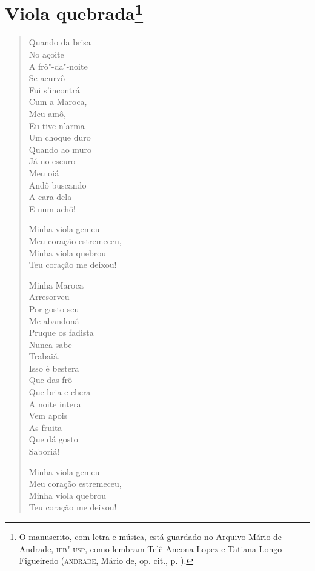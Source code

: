 \chapter{Viola quebrada\footnote[*]{O manuscrito, com letra e música, está
  guardado no Arquivo Mário de Andrade, \textsc{ieb"-usp}, como lembram Telê
  Ancona Lopez e Tatiana Longo Figueiredo (\textsc{andrade}, Mário de, op. cit.,
  p. ).}}

\begin{verse}
Quando da brisa\\
No açoite\\
A frô"-da"-noite\\
Se acurvô\\
Fui s'incontrá\\
Cum a Maroca,\\
Meu amô,\\
Eu tive n'arma\\
Um choque duro\\
Quando ao muro\\
Já no escuro\\
Meu oiá\\
Andô buscando\\
A cara dela\\
E num achô!

Minha viola gemeu\\
Meu coração estremeceu,\\
Minha viola quebrou\\
Teu coração me deixou!

Minha Maroca\\
Arresorveu\\
Por gosto seu\\
Me abandoná\\
Pruque os fadista\\
Nunca sabe\\
Trabaiá.\\
Isso é bestera\\
Que das frô\\
Que bria e chera\\
A noite intera\\
Vem apois\\
As fruita\\
Que dá gosto\\
Saboriá!

Minha viola gemeu\\
Meu coração estremeceu,\\
Minha viola quebrou\\
Teu coração me deixou!


\end{verse}
